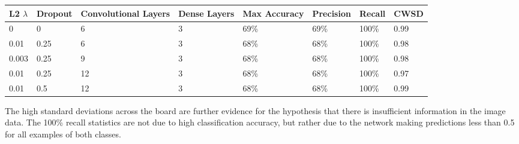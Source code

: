 \documentclass[10pt]{article}
\begin{document}
\begin{minipage}{\textwidth}
    \begin{center}
        \begin{tabular}{|l|l|l|l|l|l|l|l|}
            \hline
            L2 $\lambda$ & Dropout & Convolutional Layers & Dense Layers & Max Accuracy & Precision & Recall & CWSD \\
            \hline
            0 & 0 & 6 & 3 & 69\% & 69\% & 100\% & 0.99 \\
            \hline
            0.01 & 0.25 & 6 & 3 & 68\% & 68\% & 100\% & 0.98 \\
            \hline
            0.003 & 0.25 & 9 & 3 & 68\% & 68\% & 100\% & 0.98 \\
            \hline
            0.01 & 0.25 & 12 & 3 & 68\% & 68\% & 100\% & 0.97 \\
            \hline
            0.01 & 0.5 & 12 & 3 & 68\% & 68\% & 100\% & 0.99 \\
            \hline
        \end{tabular}
    \end{center}
\end{minipage}

The high standard deviations across the board are further evidence for the hypothesis that there is insufficient information in the image data. The 100\% recall statistics are not due to high classification accuracy, but rather due to the network making predictions less than 0.5 for all examples of both classes.
\end{document}
